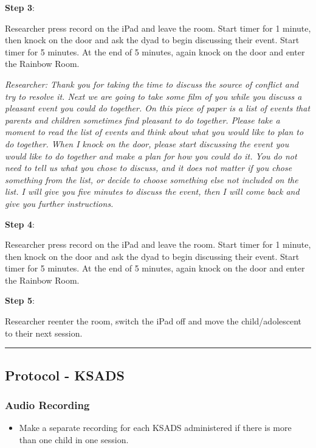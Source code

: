 \documentclass[]{book}
\providecommand{\tightlist}{%
  \setlength{\itemsep}{0pt}\setlength{\parskip}{0pt}}
\begin{document}
\textbf{Step 3}:

Researcher press record on the iPad and leave the room. Start timer for 1 minute, then knock on the door and ask the dyad to begin discussing their event. Start timer for 5 minutes. At the end of 5 minutes, again knock on the door and enter the Rainbow Room.

\emph{Researcher: Thank you for taking the time to discuss the source of conflict and try to resolve it. Next we are going to take some film of you while you discuss a pleasant event you could do together. On this piece of paper is a list of events that parents and children sometimes find pleasant to do together. Please take a moment to read the list of events and think about what you would like to plan to do together. When I knock on the door, please start discussing the event you would like to do together and make a plan for how you could do it. You do not need to tell us what you chose to discuss, and it does not matter if you chose something from the list, or decide to choose something else not included on the list. I will give you five minutes to discuss the event, then I will come back and give you further instructions.}

\textbf{Step 4}:

Researcher press record on the iPad and leave the room. Start timer for 1 minute, then knock on the door and ask the dyad to begin discussing their event. Start timer for 5 minutes. At the end of 5 minutes, again knock on the door and enter the Rainbow Room.

\textbf{Step 5}:

Researcher reenter the room, switch the iPad off and move the child/adolescent to their next session.

\begin{center}\rule{0.5\linewidth}{0.5pt}\end{center}

\hypertarget{protocol---ksads}{%
\subsection{Protocol - KSADS}\label{protocol---ksads}}

\hypertarget{audio-recording}{%
\subsubsection{Audio Recording}\label{audio-recording}}

\begin{itemize}
\tightlist
\item
  Make a separate recording for each KSADS administered if there is more than one child in one session.
\end{itemize}
\end{document}
